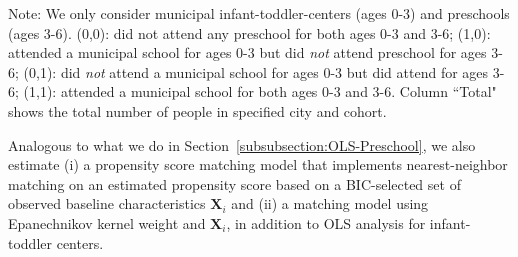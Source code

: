 \begin{table}[H] \caption{Number of Individuals in Each Group} \label{tab:num-group-2}
\begin{flushleft}
\footnotesize{Note:} We only consider municipal infant-toddler-centers (ages 0-3) and preschools (ages 3-6). (0,0): did not attend any preschool for both ages 0-3 and 3-6; (1,0): attended a municipal school for ages 0-3 but did \textit{not} attend preschool for ages 3-6; (0,1): did \textit{not} attend a municipal school for ages 0-3 but did attend for ages 3-6; (1,1): attended a municipal school for both ages 0-3 and 3-6. Column ``Total" shows the total number of people in specified city and cohort.
\end{flushleft}
\end{table}

Analogous to what we do in Section~\ref{subsubsection:OLS-Preschool}, we also estimate (i) a propensity score matching model that implements nearest-neighbor matching on an estimated propensity score based on a BIC-selected set of observed baseline characteristics $\boldsymbol{X}_i$ and (ii) a matching model using Epanechnikov kernel weight and $\boldsymbol{X}_i$, in addition to OLS analysis for infant-toddler centers.

